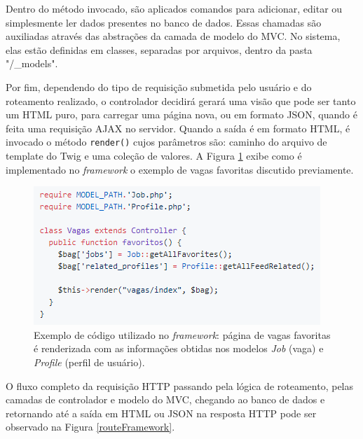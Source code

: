 Dentro do método invocado, são aplicados comandos para adicionar, editar ou simplesmente ler dados presentes no banco de dados. Essas chamadas são auxiliadas através das abstrações da camada de modelo do MVC. No sistema, elas estão definidas em classes, separadas por arquivos, dentro da pasta "/\_models".

Por fim, dependendo do tipo de requisição submetida pelo usuário e do roteamento realizado, o controlador decidirá gerará uma visão que pode ser tanto um HTML puro, para carregar uma página nova, ou em formato JSON, quando é feita uma requisição AJAX no servidor. Quando a saída é em formato HTML, é invocado o método \verb|render()| cujos parâmetros são: caminho do arquivo de template do Twig e uma coleção de valores. A Figura \ref{codeFramework} exibe como é implementado no \textit{framework} o exemplo de vagas favoritas discutido previamente.

\begin{figure}[h]
    \caption{Exemplo de código utilizado no \textit{framework}: página de vagas favoritas é renderizada com as informações obtidas nos modelos \textit{Job} (vaga) e \textit{Profile} (perfil de usuário). }
        \begin{center}
            \includegraphics[width=.75\textwidth]{figuras/code-1.png}
        \end{center}
    \label{codeFramework}
\end{figure}

O fluxo completo da requisição HTTP passando pela lógica de roteamento, pelas camadas de controlador e modelo do MVC, chegando ao banco de dados e retornando até a saída em HTML ou JSON na resposta HTTP pode ser observado na Figura \ref{routeFramework}.

